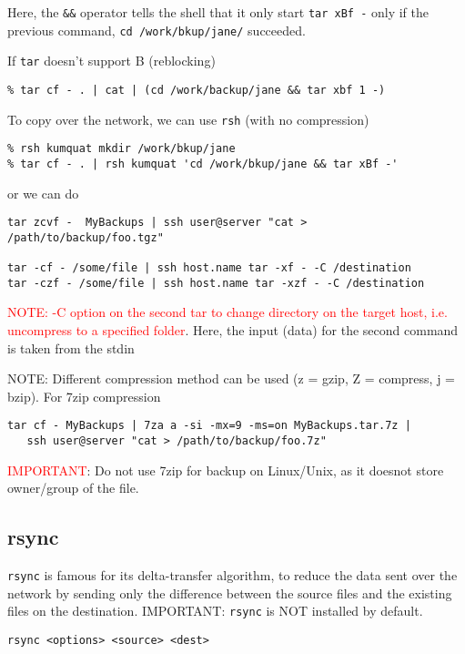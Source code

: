 Here, the \verb!&&! operator tells the shell that it only start \verb!tar xBf -!
only if the previous command, \verb!cd /work/bkup/jane/! succeeded. 

If \verb!tar! doesn't support B (reblocking)
{\tiny
\begin{verbatim}
% tar cf - . | cat | (cd /work/backup/jane && tar xbf 1 -)
\end{verbatim}
}

To copy over the network, we can use \verb!rsh! (with no compression)
{\tiny
\begin{verbatim}
% rsh kumquat mkdir /work/bkup/jane
% tar cf - . | rsh kumquat 'cd /work/bkup/jane && tar xBf -'
\end{verbatim}
}

or we can do
{\tiny
\begin{verbatim}
tar zcvf -  MyBackups | ssh user@server "cat > /path/to/backup/foo.tgz"

tar -cf - /some/file | ssh host.name tar -xf - -C /destination
tar -czf - /some/file | ssh host.name tar -xzf - -C /destination
\end{verbatim}
}

\textcolor{red}{NOTE: -C option on the second tar to change
directory on the target host, i.e. uncompress to a specified folder}. Here, the
input (data) for the second command is taken from the stdin

NOTE: Different compression method can be used (z = gzip, Z = compress, j =
bzip). For 7zip compression
{\tiny
\begin{verbatim}
tar cf - MyBackups | 7za a -si -mx=9 -ms=on MyBackups.tar.7z | 
   ssh user@server "cat > /path/to/backup/foo.7z"
\end{verbatim}
}

\textcolor{red}{IMPORTANT}: Do not use 7zip for backup on Linux/Unix, as it
doesnot store owner/group of the file.

\subsection{rsync}
\label{sec:rsync}

\verb!rsync! is famous for its delta-transfer algorithm, to reduce the data
sent over the network by sending only the difference between the source files
and the existing files on the destination. IMPORTANT: \verb!rsync! is NOT
installed by default.

\begin{verbatim}
rsync <options> <source> <dest>
\end{verbatim}

